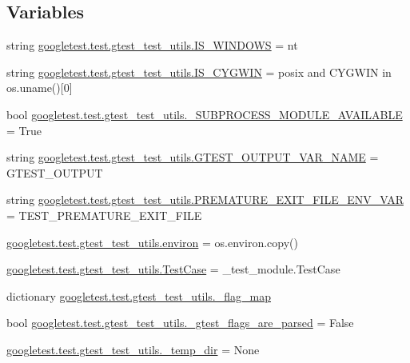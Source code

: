 \subsection*{Variables}
\begin{DoxyCompactItemize}
\item 
string \mbox{\hyperlink{namespacegoogletest_1_1test_1_1gtest__test__utils_a6b3584ff14e7fd8a73463f1beccbe439}{googletest.\+test.\+gtest\+\_\+test\+\_\+utils.\+I\+S\+\_\+\+W\+I\+N\+D\+O\+WS}} = \textquotesingle{}nt\textquotesingle{}
\item 
string \mbox{\hyperlink{namespacegoogletest_1_1test_1_1gtest__test__utils_af65a90c167ec83a25495277029e949a9}{googletest.\+test.\+gtest\+\_\+test\+\_\+utils.\+I\+S\+\_\+\+C\+Y\+G\+W\+IN}} = \textquotesingle{}posix\textquotesingle{} and \textquotesingle{}C\+Y\+G\+W\+IN\textquotesingle{} in os.\+uname()\mbox{[}0\mbox{]}
\item 
bool \mbox{\hyperlink{namespacegoogletest_1_1test_1_1gtest__test__utils_ae25e29cef5edd0f30c247cc061e98cf8}{googletest.\+test.\+gtest\+\_\+test\+\_\+utils.\+\_\+\+S\+U\+B\+P\+R\+O\+C\+E\+S\+S\+\_\+\+M\+O\+D\+U\+L\+E\+\_\+\+A\+V\+A\+I\+L\+A\+B\+LE}} = True
\item 
string \mbox{\hyperlink{namespacegoogletest_1_1test_1_1gtest__test__utils_abe97dd3cf6bb1fb54490bf7c9d7ce40f}{googletest.\+test.\+gtest\+\_\+test\+\_\+utils.\+G\+T\+E\+S\+T\+\_\+\+O\+U\+T\+P\+U\+T\+\_\+\+V\+A\+R\+\_\+\+N\+A\+ME}} = \textquotesingle{}G\+T\+E\+S\+T\+\_\+\+O\+U\+T\+P\+UT\textquotesingle{}
\item 
string \mbox{\hyperlink{namespacegoogletest_1_1test_1_1gtest__test__utils_ac2f6a398a41a5a183017db8120aee0a2}{googletest.\+test.\+gtest\+\_\+test\+\_\+utils.\+P\+R\+E\+M\+A\+T\+U\+R\+E\+\_\+\+E\+X\+I\+T\+\_\+\+F\+I\+L\+E\+\_\+\+E\+N\+V\+\_\+\+V\+AR}} = \textquotesingle{}T\+E\+S\+T\+\_\+\+P\+R\+E\+M\+A\+T\+U\+R\+E\+\_\+\+E\+X\+I\+T\+\_\+\+F\+I\+LE\textquotesingle{}
\item 
\mbox{\hyperlink{namespacegoogletest_1_1test_1_1gtest__test__utils_a3d414b92f5efbce5fb7c075a55ec36d8}{googletest.\+test.\+gtest\+\_\+test\+\_\+utils.\+environ}} = os.\+environ.\+copy()
\item 
\mbox{\hyperlink{namespacegoogletest_1_1test_1_1gtest__test__utils_ae9c65c0ce53968419bdc79e62d3adef6}{googletest.\+test.\+gtest\+\_\+test\+\_\+utils.\+Test\+Case}} = \+\_\+test\+\_\+module.\+Test\+Case
\item 
dictionary \mbox{\hyperlink{namespacegoogletest_1_1test_1_1gtest__test__utils_a1ac2833d8030351317303334c93a49c1}{googletest.\+test.\+gtest\+\_\+test\+\_\+utils.\+\_\+flag\+\_\+map}}
\item 
bool \mbox{\hyperlink{namespacegoogletest_1_1test_1_1gtest__test__utils_a1b1c5ce95e4aa3c285b6c508b316ccf6}{googletest.\+test.\+gtest\+\_\+test\+\_\+utils.\+\_\+gtest\+\_\+flags\+\_\+are\+\_\+parsed}} = False
\item 
\mbox{\hyperlink{namespacegoogletest_1_1test_1_1gtest__test__utils_a9970c82507afb3ea972f45ff989e82a2}{googletest.\+test.\+gtest\+\_\+test\+\_\+utils.\+\_\+temp\+\_\+dir}} = None
\end{DoxyCompactItemize}

